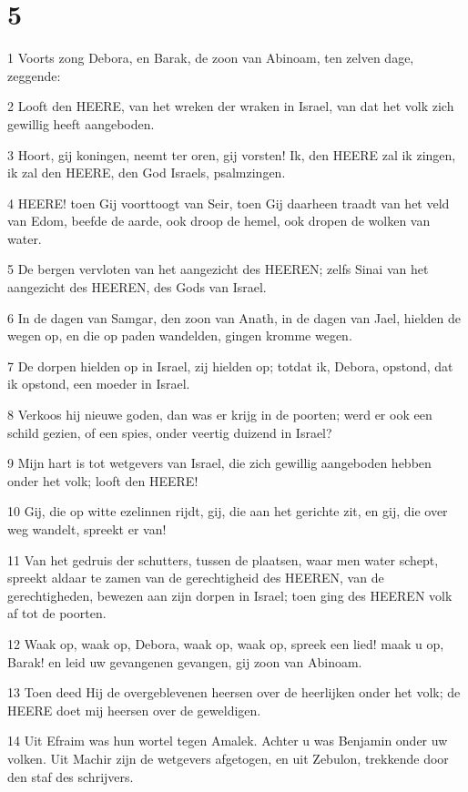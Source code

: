 \chapter{5}

\par 1 Voorts zong Debora, en Barak, de zoon van Abinoam, ten zelven dage, zeggende:
\par 2 Looft den HEERE, van het wreken der wraken in Israel, van dat het volk zich gewillig heeft aangeboden.
\par 3 Hoort, gij koningen, neemt ter oren, gij vorsten! Ik, den HEERE zal ik zingen, ik zal den HEERE, den God Israels, psalmzingen.
\par 4 HEERE! toen Gij voorttoogt van Seir, toen Gij daarheen traadt van het veld van Edom, beefde de aarde, ook droop de hemel, ook dropen de wolken van water.
\par 5 De bergen vervloten van het aangezicht des HEEREN; zelfs Sinai van het aangezicht des HEEREN, des Gods van Israel.
\par 6 In de dagen van Samgar, den zoon van Anath, in de dagen van Jael, hielden de wegen op, en die op paden wandelden, gingen kromme wegen.
\par 7 De dorpen hielden op in Israel, zij hielden op; totdat ik, Debora, opstond, dat ik opstond, een moeder in Israel.
\par 8 Verkoos hij nieuwe goden, dan was er krijg in de poorten; werd er ook een schild gezien, of een spies, onder veertig duizend in Israel?
\par 9 Mijn hart is tot wetgevers van Israel, die zich gewillig aangeboden hebben onder het volk; looft den HEERE!
\par 10 Gij, die op witte ezelinnen rijdt, gij, die aan het gerichte zit, en gij, die over weg wandelt, spreekt er van!
\par 11 Van het gedruis der schutters, tussen de plaatsen, waar men water schept, spreekt aldaar te zamen van de gerechtigheid des HEEREN, van de gerechtigheden, bewezen aan zijn dorpen in Israel; toen ging des HEEREN volk af tot de poorten.
\par 12 Waak op, waak op, Debora, waak op, waak op, spreek een lied! maak u op, Barak! en leid uw gevangenen gevangen, gij zoon van Abinoam.
\par 13 Toen deed Hij de overgeblevenen heersen over de heerlijken onder het volk; de HEERE doet mij heersen over de geweldigen.
\par 14 Uit Efraim was hun wortel tegen Amalek. Achter u was Benjamin onder uw volken. Uit Machir zijn de wetgevers afgetogen, en uit Zebulon, trekkende door den staf des schrijvers.
